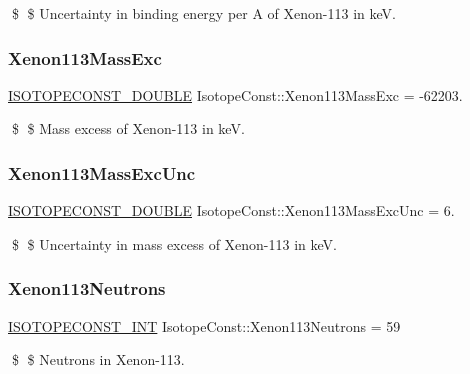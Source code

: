 \$ \$ Uncertainty in binding energy per A of Xenon-\/113 in keV. \mbox{\label{group___isotope_const-_xenon-_xe113_gac145760cc67d3347762f3078570e26c1}} 
\subsubsection{\texorpdfstring{Xenon113\+Mass\+Exc}{Xenon113MassExc}}
{\footnotesize\ttfamily \mbox{\hyperlink{group___isotope_const-_macros_ga8f45a7272ce02c0b4c65c44636ed719a}{I\+S\+O\+T\+O\+P\+E\+C\+O\+N\+S\+T\+\_\+\+D\+O\+U\+B\+LE}} Isotope\+Const\+::\+Xenon113\+Mass\+Exc = -\/62203.}

\$ \$ Mass excess of Xenon-\/113 in keV. \mbox{\label{group___isotope_const-_xenon-_xe113_ga44574d17d6bc437d868b6c594e7ce44c}} 
\subsubsection{\texorpdfstring{Xenon113\+Mass\+Exc\+Unc}{Xenon113MassExcUnc}}
{\footnotesize\ttfamily \mbox{\hyperlink{group___isotope_const-_macros_ga8f45a7272ce02c0b4c65c44636ed719a}{I\+S\+O\+T\+O\+P\+E\+C\+O\+N\+S\+T\+\_\+\+D\+O\+U\+B\+LE}} Isotope\+Const\+::\+Xenon113\+Mass\+Exc\+Unc = 6.}

\$ \$ Uncertainty in mass excess of Xenon-\/113 in keV. \mbox{\label{group___isotope_const-_xenon-_xe113_ga29b52535208e5bd92edb7c64ca434b8d}} 
\subsubsection{\texorpdfstring{Xenon113\+Neutrons}{Xenon113Neutrons}}
{\footnotesize\ttfamily \mbox{\hyperlink{group___isotope_const-_macros_ga5f18360b3e99483a35c32d789e62621c}{I\+S\+O\+T\+O\+P\+E\+C\+O\+N\+S\+T\+\_\+\+I\+NT}} Isotope\+Const\+::\+Xenon113\+Neutrons = 59}

\$ \$ Neutrons in Xenon-\/113. \mbox{\label{group___isotope_const-_xenon-_xe113_ga8d0ee246b500a1ae6b830917ccd69fda}} 
